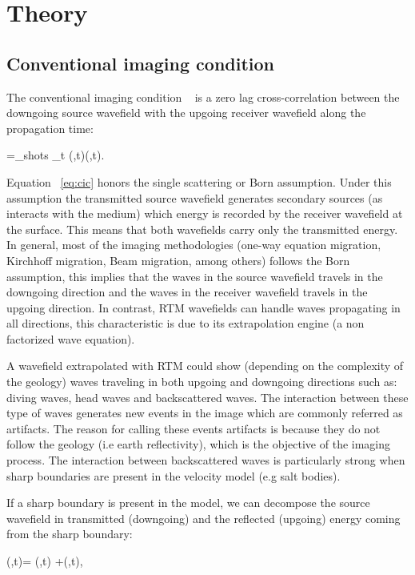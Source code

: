 \section{Theory}

\subsection{Conventional imaging condition}
The conventional imaging condition ~\citep{Claerbout:1985:IEI:3887}
is a zero lag cross-correlation between the downgoing source wavefield with the upgoing 
receiver wavefield along the propagation time:

\beq
\R=\sum_{shots} \sum_{t} \US(\xx,t)\UR(\xx,t).
\label{eq:cic}
\eeq

Equation ~\ref{eq:cic} honors the single scattering or Born assumption. Under this assumption the transmitted
source wavefield generates secondary sources (as interacts with the medium) which energy is recorded by the 
receiver wavefield at the surface. This means that both wavefields carry only the transmitted energy. In general,
 most of the imaging methodologies (one-way equation migration, Kirchhoff migration, Beam migration, among others)
follows the Born assumption, this implies that the waves in the source wavefield travels in the downgoing 
direction and the waves in the receiver wavefield travels in the upgoing direction. In contrast, RTM wavefields
can handle waves propagating in all directions, this characteristic is due to its extrapolation engine
(a non factorized wave equation).

A wavefield extrapolated with RTM could show (depending on the complexity of the geology) waves traveling in both
upgoing and downgoing directions such as: diving waves, head waves and backscattered waves. The interaction between
 these type of waves generates new events in the image which are commonly referred as artifacts. The reason for calling
 these events artifacts is because they do not follow the geology (i.e earth reflectivity), which is the objective 
of the imaging process. The interaction between backscattered waves is particularly strong when
sharp boundaries are present in the velocity model (e.g salt bodies).

If a sharp boundary is present in the model, we can decompose the source wavefield in transmitted (downgoing) 
 and the reflected (upgoing) energy coming from the sharp boundary:

\beq
\US(\xx,t)= \USr(\xx,t) +\USt(\xx,t),
\label{eq:ssplit}
\eeq

